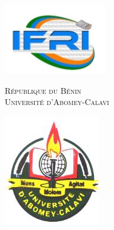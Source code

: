 \documentclass[12pt,a4paper]{article}
\author{Tafsir GNA}
\begin{document}
\setcounter{section}{0}

	\begin{titlepage}
		\centering
		
		\noindent%
		
		\begin{minipage}{.15\linewidth}
			\includegraphics[scale=0.4]{img/ifri_logo.png}
		\end{minipage}
		\hfill
		\begin{minipage}{.68\linewidth}\centering
			\textsc{République du Bénin}\\
			\vspace*{.5cm}
			\textsc{\Large Université d'Abomey-Calavi}
		\end{minipage}
		\hfill
		\begin{minipage}{.15\linewidth}
			\includegraphics[width=1\linewidth]{img/uac_logo.png}
		\end{minipage}
				

\end{titlepage}
\end{document}

